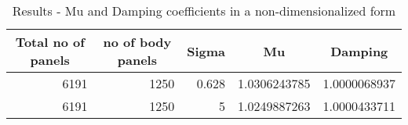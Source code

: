 \begin{table}[htbp]
\centering
\caption{Results - Mu and Damping coefficients in a non-dimensionalized form}
\begin{tabular}{|r|r|r|r|r|}
\hline
\multicolumn{1}{|c|}{\textbf{Total no of panels}} & \multicolumn{1}{c|}{\textbf{no of body panels}} & \multicolumn{1}{c|}{\textbf{Sigma}} & \multicolumn{1}{c|}{\textbf{Mu}} & \multicolumn{1}{c|}{\textbf{Damping}} \\ \hline
6191 & 1250 & 0.628 & 1.0306243785 & 1.0000068937 \\ \hline
6191 & 1250 & 5 & 1.0249887263 & 1.0000433711 \\ \hline
\end{tabular}
\label{results_table}
\end{table}
